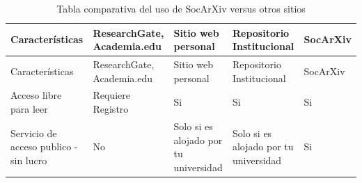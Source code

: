 \documentclass[
  spanish,
  a4paper,
  oneside]{scrbook}
\begin{document}
\begin{longtable}[]{@{}
  >{\raggedright\arraybackslash}p{}
  >{\raggedright\arraybackslash}p{}
  >{\raggedright\arraybackslash}p{}
  >{\raggedright\arraybackslash}p{}
  >{\raggedright\arraybackslash}p{}@{}}
\caption{Tabla comparativa del uso de SocArXiv versus otros
sitios}\label{tbl-coom}\tabularnewline
\toprule\noalign{}
\begin{minipage}[b]{\linewidth}\raggedright
Características
\end{minipage} & \begin{minipage}[b]{\linewidth}\raggedright
ResearchGate, Academia.edu
\end{minipage} & \begin{minipage}[b]{\linewidth}\raggedright
Sitio web personal
\end{minipage} & \begin{minipage}[b]{\linewidth}\raggedright
Repositorio Institucional
\end{minipage} & \begin{minipage}[b]{\linewidth}\raggedright
SocArXiv
\end{minipage} \\
\midrule\noalign{}
\endfirsthead
\toprule\noalign{}
\begin{minipage}[b]{\linewidth}\raggedright
Características
\end{minipage} & \begin{minipage}[b]{\linewidth}\raggedright
ResearchGate, Academia.edu
\end{minipage} & \begin{minipage}[b]{\linewidth}\raggedright
Sitio web personal
\end{minipage} & \begin{minipage}[b]{\linewidth}\raggedright
Repositorio Institucional
\end{minipage} & \begin{minipage}[b]{\linewidth}\raggedright
SocArXiv
\end{minipage} \\
\midrule\noalign{}
\endhead
\bottomrule\noalign{}
\endlastfoot
Acceso libre para leer & Requiere Registro & Si & Si & Si \\
Servicio de acceso publico - sin lucro & No & Solo si es alojado por tu
universidad & Solo si es alojado por tu universidad & Si \\

\end{longtable}
\end{document}
